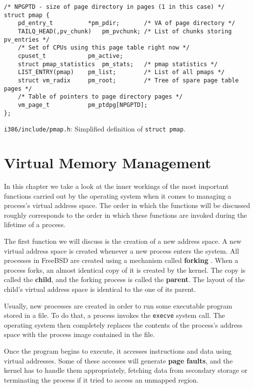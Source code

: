 \documentclass[shortabstract, english]{iithesis}
\begin{document}
\begin{listing}[H]
\begin{verbatim}
/* NPGPTD - size of page directory in pages (1 in this case) */
struct pmap {
    pd_entry_t          *pm_pdir;       /* VA of page directory */
    TAILQ_HEAD(,pv_chunk)   pm_pvchunk; /* List of chunks storing pv_entries */
    /* Set of CPUs using this page table right now */
    cpuset_t            pm_active;
    struct pmap_statistics  pm_stats;   /* pmap statistics */
    LIST_ENTRY(pmap)    pm_list;        /* List of all pmaps */
    struct vm_radix     pm_root;        /* Tree of spare page table pages */
    /* Table of pointers to page directory pages */
    vm_page_t           pm_ptdpg[NPGPTD];
};
\end{verbatim}
\caption{\texttt{i386/include/pmap.h}: Simplified definition of \texttt{struct pmap}.}
\end{listing}


\chapter{Virtual Memory Management}

In this chapter we take a look at the inner workings of the most important
functions carried out by the operating system when it comes to managing a
process's virtual address space. The order in which the functions will be
discussed roughly corresponds to the order in which these functions are invoked
during the lifetime of a process.

The first function we will discuss is the creation of a new address space. A new
virtual address space is created whenever a new process enters the system. All
processes in FreeBSD are created using a mechanism called \textbf{forking}
\cite[Section~1.6.1]{bib:tanenbaum}. When a process forks, an almost identical
copy of it is created by the kernel. The copy is called the \textbf{child}, and
the forking process is called the \textbf{parent}. The layout of the child's
virtual address space is identical to the one of its parent.

Usually, new processes are created in order to run some executable program
stored in a file. To do that, a process invokes the \texttt{execve}
\cite{freebsd:execve} system call. The operating system then completely replaces
the contents of the process's address space with the process image contained in
the file.

Once the program begins to execute, it accesses instructions and data using
virtual addresses. Some of these accesses will generate \textbf{page faults},
and the kernel has to handle them appropriately, fetching data from secondary
storage or terminating the process if it tried to access an unmapped region.
\end{document}
